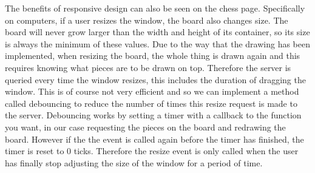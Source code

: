 The benefits of responsive design can also be seen on the chess page. Specifically on computers, if a user resizes the window, the board also changes size. The board will never grow larger than the width and height of its container, so its size is always the minimum of these values. Due to the way that the drawing has been implemented, when resizing the board, the whole thing is drawn again and this requires knowing what pieces are to be drawn on top. Therefore the server is queried every time the window resizes, this includes the duration of dragging the window. This is of course not very efficient and so we can implement a method called debouncing \cite{Debouncing} to reduce the number of times this resize request is made to the server. Debouncing works by setting a timer with a callback to the function you want, in our case requesting the pieces on the board and redrawing the board. However if the the event is called again before the timer has finished, the timer is reset to 0 ticks. Therefore the resize event is only called when the user has finally stop adjusting the size of the window for a period of time.